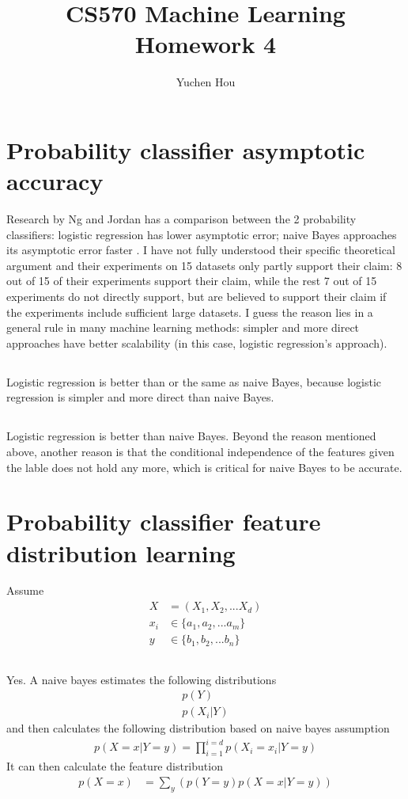 \documentclass[12pt]{article}
\begin{document}
\title{CS570 Machine Learning Homework 4}
\author{Yuchen Hou}
\maketitle

\section{Probability classifier asymptotic accuracy}
Research by Ng and Jordan has a comparison between the 2 probability classifiers: logistic regression has lower asymptotic error; naive Bayes approaches its asymptotic error faster \cite{jordan2002discriminative}. I have not fully understood their specific theoretical argument and their experiments on 15 datasets only partly support their claim: 8 out of 15 of their experiments support their claim, while the rest 7 out of 15 experiments do not directly support, but are believed to support their claim if the experiments include sufficient large datasets. I guess the reason lies in a general rule in many machine learning methods: simpler and more direct approaches have better scalability (in this case, logistic regression's approach).
\subsection{}
Logistic regression is better than or the same as naive Bayes, because logistic regression is simpler and more direct than naive Bayes.
\subsection{}
Logistic regression is better than naive Bayes. Beyond the reason mentioned above, another reason is that the conditional independence of the features given the lable does not hold any more, which is critical for naive Bayes to be accurate.

\section{Probability classifier feature distribution learning}
Assume
\begin{align*}
  X &= (X_1, X_2, ... X_d) \\
  x_i &\in \{a_1, a_2, ... a_m\} \\
  y &\in \{b_1, b_2, ... b_n\}
\end{align*}
\subsection{}
Yes. A naive bayes estimates the following distributions
\begin{align*}
  p(Y) \\
  p(X_i|Y)
\end{align*}
and then calculates the following distribution based on naive bayes assumption
\begin{align*}
  p(X=x|Y=y) = \prod_{i=1}^{i=d} p(X_i=x_i|Y=y)
\end{align*}
It can then calculate the feature distribution
\begin{align*}
  p(X=x) &= \sum_y (p(Y=y) p(X=x|Y=y))
\end{align*}
\end{document}
